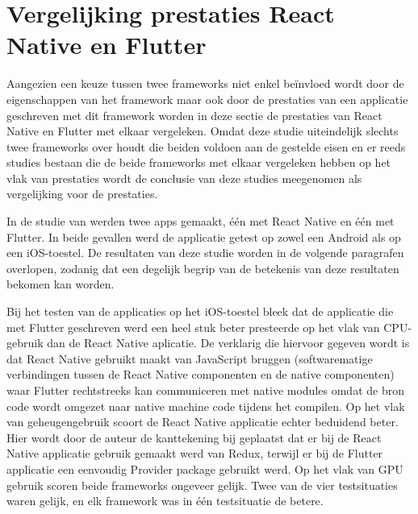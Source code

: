 \section{Vergelijking prestaties React Native en Flutter}
\label{sec:vglPrestaties}

Aangezien een keuze tussen twee frameworks niet enkel beïnvloed wordt door de eigenschappen van het framework maar ook door de prestaties van een applicatie geschreven met dit framework worden in deze sectie de prestaties van React Native en Flutter met elkaar vergeleken. Omdat deze studie uiteindelijk slechts twee frameworks over houdt die beiden voldoen aan de gestelde eisen en er reeds studies bestaan die de beide frameworks met elkaar vergeleken hebben op het vlak van prestaties wordt de conclusie van deze studies meegenomen als vergelijking voor de prestaties. 

In de studie van \textcite{Fentaw2020} werden twee apps gemaakt, één met React Native en één met Flutter. In beide gevallen werd de applicatie getest op zowel een Android als op een iOS-toestel. De resultaten van deze studie worden in de volgende paragrafen overlopen, zodanig dat een degelijk begrip van de betekenis van deze resultaten bekomen kan worden.

Bij het testen van de applicaties op het iOS-toestel bleek dat de applicatie die met Flutter geschreven werd een heel stuk beter presteerde op het vlak van CPU-gebruik dan de React Native aplicatie. De verklarig die hiervoor gegeven wordt is dat React Native gebruikt maakt van JavaScript bruggen (softwarematige verbindingen tussen de React Native componenten en de native componenten) waar Flutter rechtstreeks kan communiceren met native modules omdat de bron code wordt omgezet naar native machine code tijdens het compilen. Op het vlak van geheugengebruik scoort de React Native applicatie echter beduidend beter. Hier wordt door de auteur de kanttekening bij geplaatst dat er bij de React Native applicatie gebruik gemaakt werd van Redux, terwijl er bij de Flutter applicatie een eenvoudig Provider package gebruikt werd. Op het vlak van GPU gebruik scoren beide frameworks ongeveer gelijk. Twee van de vier testsituaties waren gelijk, en elk framework was in één testsituatie de betere. 



